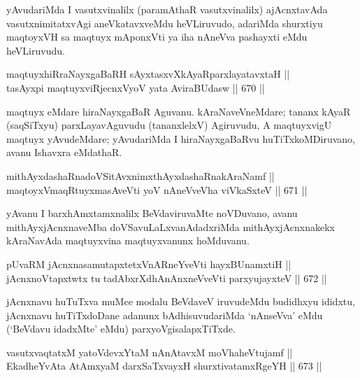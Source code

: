 \begin{artha} 
yAvudariMda I vasutxvinalilx (paramAthaR vasutxvinalilx) ajAcnxtavAda 
vasutxnimitatxvAgi aneVkatavxveMdu heVLiruvudo, adariMda shurxtiyu 
maqtoyxVH sa maqtuyx mAponxVti ya iha nAneVva pashayxti eMdu heVLiruvudu.
\end{artha}

\begin{shl}
maqtuyxhiRraNayxgaBaRH sAyxtasxvXkAyaRparxlayatavxtaH || \\
tasAyxpi maqtuyxviRjecnxVyoV yata AviraBUdasw ||  670 ||  
\end{shl}

\begin{artha} 
maqtuyx eMdare hiraNayxgaBaR Aguvanu. kAraNaveVneMdare; tananx kAyaR 
(saqSiTxyu) parxLayavAguvudu (tananxlelxV) Agiruvudu, A maqtuyxvigU 
maqtuyx yAvudeMdare; yAvudariMda I hiraNayxgaBaRvu huTiTxkoMDiruvano, 
avanu Ishavxra eMdathaR.
\end{artha}

\begin{shl}
mithAyxdashaRnadoVSitAvxnimxthAyxdashaRnakAraNamf || \\
maqtoyxVmaqRtuyxmasAveVti yoV nAneVveVha viVkaSxteV ||  671 ||  
\end{shl}

\begin{artha} 
yAvanu I barxhAmxtamxnalilx BeVdaviruvaMte noVDuvano, avanu 
mithAyxjAcnxnaveMba doVSavuLaLxvanAdadxriMda mithAyxjAcnxnakekx 
kAraNavAda maqtuyxvina maqtuyxvanunx hoMduvanu.
\end{artha}


\begin{shl}
pUvaRM jAcnxnasamutapxtetxVnARneYveVti hayxBUnamxtiH || \\
jAcnxnoVtapxtwtx tu tadAbxrXdhAnAnxneVveVti parxyujayxteV ||  672 ||  
\end{shl}

\begin{artha} 
jAcnxnavu huTuTxva muMce modalu BeVdaveV iruvudeMdu budidhxyu ididxtu, 
jAcnxnavu huTiTxdoDane adanunx bAdhisuvudariMda `nAnseVva' eMdu 
(`BeVdavu idadxMte' eMdu) parxyoVgisalapxTiTxde.
\end{artha}


\begin{shl}
vasutxvaqtatxM yatoV\s devxYtaM nAnAtavxM moVhaheVtujamf || \\
EkadheYvAta AtAmx\s yaM darxSaTxvayxH shurxtivatamxRgeYH ||  673 ||  
\end{shl}

